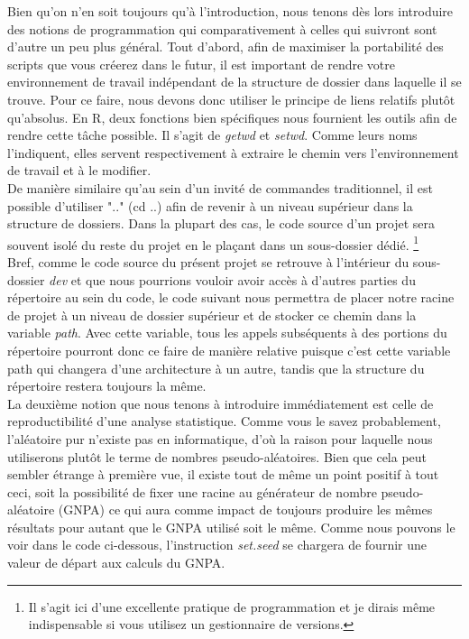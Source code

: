 \noindent
Bien qu'on n'en soit toujours qu'à l'introduction, nous tenons dès lors introduire des notions de programmation qui comparativement à celles qui suivront sont d'autre un peu plus général. Tout d'abord, afin de maximiser la portabilité des scripts que vous créerez dans le futur, il est important de rendre votre environnement de travail indépendant de la structure de dossier dans laquelle il se trouve. Pour ce faire, nous devons donc utiliser le principe de liens relatifs plutôt qu'absolus. En R, deux fonctions bien spécifiques nous fournient les outils afin de rendre cette tâche possible. Il s'agit de \emph{getwd} et \emph{setwd}. Comme leurs noms l'indiquent, elles servent respectivement à extraire le chemin vers l'environnement de travail et à le modifier. \\

\noindent
De manière similaire qu'au sein d'un invité de commandes traditionnel, il est possible d'utiliser ".." (cd ..) afin de revenir à un niveau supérieur dans la structure de dossiers. Dans la plupart des cas, le code source d'un projet sera souvent isolé du reste du projet en le plaçant dans un sous-dossier dédié. \footnote{Il s'agit ici d'une excellente pratique de programmation et je dirais même indispensable si vous utilisez un gestionnaire de versions.} \\

\noindent
Bref, comme le code source du présent projet se retrouve à l'intérieur du sous-dossier \emph{dev} et que nous pourrions vouloir avoir accès à d'autres parties du répertoire au sein du code, le code suivant nous permettra de placer notre racine de projet à un niveau de dossier supérieur et de stocker ce chemin dans la variable \emph{path}. Avec cette variable, tous les appels subséquents à des portions du répertoire pourront donc ce faire de manière relative puisque c'est cette variable path qui changera d'une architecture à un autre, tandis que la structure du répertoire restera toujours la même. \\

\noindent
La deuxième notion que nous tenons à introduire immédiatement est celle de reproductibilité d'une analyse statistique. Comme vous le savez probablement, l'aléatoire pur n'existe pas en informatique, d'où la raison pour laquelle nous utiliserons plutôt le terme de nombres pseudo-aléatoires. Bien que cela peut sembler étrange à première vue, il existe tout de même un point positif à tout ceci, soit la possibilité de fixer une racine au générateur de nombre pseudo-aléatoire (GNPA) ce qui aura comme impact de toujours produire les mêmes résultats pour autant que le GNPA utilisé soit le même. Comme nous pouvons le voir dans le code ci-dessous, l'instruction \emph{set.seed} se chargera de fournir une valeur de départ aux calculs du GNPA.

